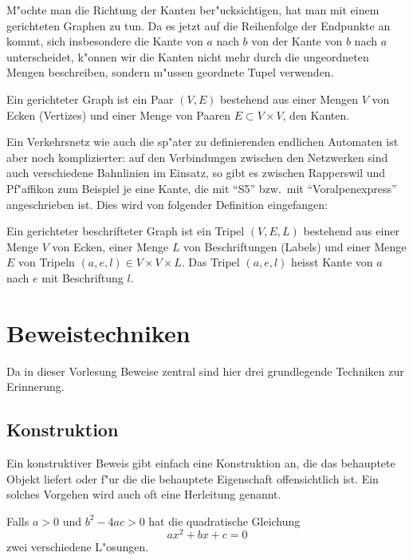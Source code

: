 M"ochte man die Richtung der Kanten ber"ucksichtigen,
hat man mit einem gerichteten
Graphen zu tun. Da es jetzt auf die Reihenfolge der Endpunkte an kommt,
sich insbesondere die Kante von $a$ nach $b$ von der Kante von $b$ nach
$a$ unterscheidet, k"onnen wir die Kanten nicht mehr durch die ungeordneten
Mengen beschreiben, sondern m"ussen geordnete Tupel verwenden.

\begin{definition}
\label{def_gerichteter_graph}
Ein gerichteter Graph ist ein Paar $(V,E)$ bestehend aus einer
Mengen $V$ von Ecken (Vertizes) und einer Menge von Paaren $E\subset V\times V$,
den Kanten.
\end{definition}

Ein Verkehrsnetz wie auch die sp"ater zu definierenden endlichen
Automaten ist aber noch komplizierter: auf den Verbindungen zwischen
den Netzwerken sind auch verschiedene Bahnlinien im Einsatz, so gibt
es zwischen Rapperswil und Pf"affikon zum Beispiel je eine Kante, die
mit ``S5'' bzw.~mit ``Voralpenexpress'' angeschrieben ist. Dies
wird von folgender Definition eingefangen:

\begin{definition}
\label{def_gerichteter_beschrifteter_graph}
Ein gerichteter beschrifteter Graph ist ein Tripel $(V,E,L)$ bestehend
aus einer Menge $V$ von Ecken, einer Menge $L$ von Beschriftungen (Labels) und 
einer Menge $E$ von Tripeln $(a,e,l)\in V\times V\times L$. Das
Tripel $(a,e,l)$ heisst Kante von $a$ nach $e$ mit Beschriftung $l$.
\end{definition}

\section{Beweistechniken}
Da in dieser Vorlesung Beweise zentral sind hier drei grundlegende 
Techniken zur Erinnerung.

\subsection{Konstruktion}
Ein konstruktiver Beweis gibt einfach eine Konstruktion an, die
das behauptete Objekt liefert oder f"ur die die behauptete Eigenschaft
offensichtlich ist.
Ein solches Vorgehen wird auch oft eine Herleitung genannt.

\begin{satz}
Falls $a>0$ und $b^2-4ac>0$ hat die quadratische Gleichung
\[
ax^2+bx+c=0
\]
zwei verschiedene L"osungen.
\end{satz}

